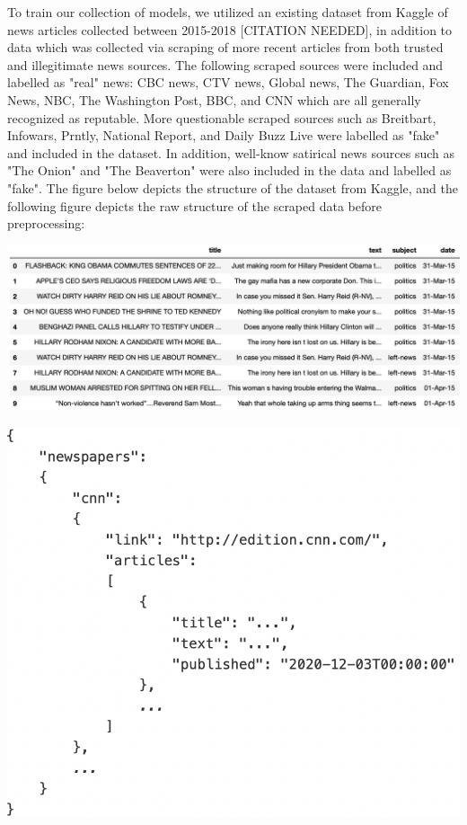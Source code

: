 \documentclass[10pt,twocolumn,letterpaper]{article}
\begin{document}
To train our collection of models, we utilized an existing dataset from Kaggle of news articles collected between 2015-2018 [CITATION NEEDED], in addition to data which was collected via scraping of more recent articles from both trusted and illegitimate news sources. The following scraped sources were included and labelled as "real" news: CBC news, CTV news, Global news, The Guardian, Fox News, NBC, The Washington Post, BBC, and CNN which are all generally recognized as reputable. More questionable scraped sources such as Breitbart, Infowars, Prntly, National Report, and Daily Buzz Live were labelled as "fake" and included in the dataset. In addition, well-know satirical news sources such as "The Onion" and "The Beaverton" were also included in the data and labelled as "fake". The figure below depicts the structure of the dataset from Kaggle, and the following figure depicts the raw structure of the scraped data before preprocessing:
\begin{center}
\includegraphics[scale=0.3]{dt_example.png}
\end{center}
\begin{center}
\includegraphics[scale=0.3]{scraped_example.png}
\end{center}
\end{document}
